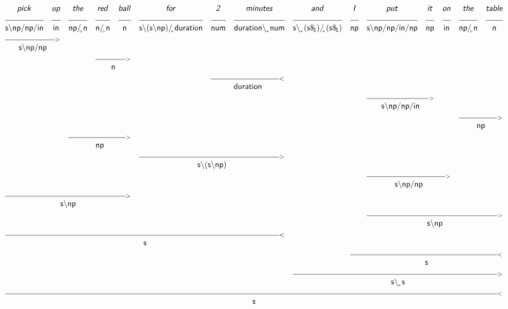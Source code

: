 \documentclass{article}
\newcommand{\deriv}[2]
{  \renewcommand{\arraystretch}{.5}
$\begin{array}[t]{*{#1}{c}}
     #2
   \end{array}$ }
\newcommand{\gf}[1]{\textsf{\textsl{#1}}}
\newcommand{\cf}[1]{\mbox{\ensuremath{\cfont{#1}}}}
\newcommand{\uline}[1]
{\mc{#1}{\hrulefill} }
\newcommand{\mc}[2]
  {\multicolumn{#1}{c}{#2}}
\newcommand{\cfont}{\mathsf}
\newcommand{\bs}{\backslash}
\newcommand{\subsa}[1]{\hspace{-0.75mm}_{_{#1}}}
\newcommand{\subsb}[1]{\hspace{-0.10mm}_{_{#1}}}
\newcommand{\subs}[1]{\hspace{-0.40mm}_{#1}}
\begin{document}
\deriv{15}{
\gf{pick} & \gf{up} & \gf{the} & \gf{red} & \gf{ball} & \gf{for} & \gf{2} & \gf{minutes} & \gf{and} & \gf{I} & \gf{put} & \gf{it} & \gf{on} & \gf{the} & \gf{table} \\
\uline{1} & \uline{1} & \uline{1} & \uline{1} & \uline{1} & \uline{1} & \uline{1} & \uline{1} & \uline{1} & \uline{1} & \uline{1} & \uline{1} & \uline{1} & \uline{1} & \uline{1} \\
\cf{s\bs np/ np/ in} & \cf{in} & \cf{np/ \subsa{\diamond} n} & \cf{n/ \subsa{\diamond} n} & \cf{n} & \cf{s\bs (s\bs np)/ \subsa{*} duration} & \cf{num} & \cf{duration\bs \subsb{*} num} & \cf{s\bs \subsb{*} (s\$ \subs{1})/ \subsa{*} (s\$ \subs{1})} & \cf{np} & \cf{s\bs np/ np/ in/ np} & \cf{np} & \cf{in} & \cf{np/ \subsa{\diamond} n} & \cf{n} \\
 \mc{2} {\hrulefill_{>}} \\
 \mc{2}{\cf{s\bs np/ np}} \\
&&& \mc{2} {\hrulefill_{>}} \\
&&& \mc{2}{\cf{n}} \\
&&&&&& \mc{2} {\hrulefill_{<}} \\
&&&&&& \mc{2}{\cf{duration}} \\
&&&&&&&&&& \mc{2} {\hrulefill_{>}} \\
&&&&&&&&&& \mc{2}{\cf{s\bs np/ np/ in}} \\
&&&&&&&&&&&&& \mc{2} {\hrulefill_{>}} \\
&&&&&&&&&&&&& \mc{2}{\cf{np}} \\
&& \mc{3} {\hrulefill_{>}} \\
&& \mc{3}{\cf{np}} \\
&&&&& \mc{3} {\hrulefill_{>}} \\
&&&&& \mc{3}{\cf{s\bs (s\bs np)}} \\
&&&&&&&&&& \mc{3} {\hrulefill_{>}} \\
&&&&&&&&&& \mc{3}{\cf{s\bs np/ np}} \\
 \mc{5} {\hrulefill_{>}} \\
 \mc{5}{\cf{s\bs np}} \\
&&&&&&&&&& \mc{5} {\hrulefill_{>}} \\
&&&&&&&&&& \mc{5}{\cf{s\bs np}} \\
 \mc{8} {\hrulefill_{<}} \\
 \mc{8}{\cf{s}} \\
&&&&&&&&& \mc{6} {\hrulefill_{<}} \\
&&&&&&&&& \mc{6}{\cf{s}} \\
&&&&&&&& \mc{7} {\hrulefill_{>}} \\
&&&&&&&& \mc{7}{\cf{s\bs \subsb{*} s}} \\
 \mc{15} {\hrulefill_{<}} \\
 \mc{15}{\cf{s}} \\
}

\vspace{5mm}
\end{document}
